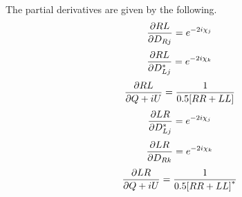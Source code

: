 The partial derivatives are given by the following.
$${\partial RL \over{\partial D_{Rj}}} = e^{-2i\chi_j} $$
$${\partial RL \over{\partial D^*_{Lj}}} = e^{-2i\chi_k}$$
$${\partial RL \over{\partial Q+iU}} = {1\over{0.5 [RR + LL]}}$$
$${\partial LR \over{\partial {D^*_{Lj}}}} = e^{-2i\chi_j} $$
$${\partial LR \over{\partial D_{Rk}}} = e^{-2i\chi_k}$$
$${\partial LR \over{\partial Q+iU}} = {1\over{0.5
{[RR + LL]}^*}} $$




